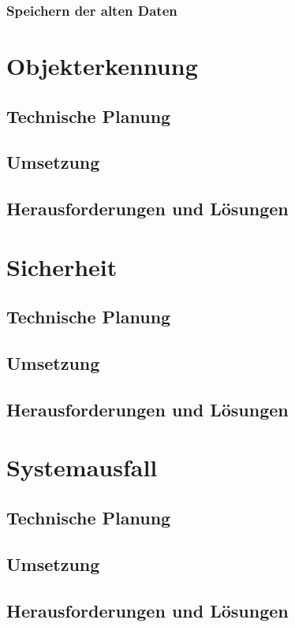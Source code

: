    \subsubsection{Speichern der alten Daten}


\section{Objekterkennung}

  \subsection{Technische Planung}

  \subsection{Umsetzung}

  \subsection{Herausforderungen und Lösungen}

\section{Sicherheit}

  \subsection{Technische Planung}

  \subsection{Umsetzung}

  \subsection{Herausforderungen und Lösungen}

\section{Systemausfall}

  \subsection{Technische Planung}

  \subsection{Umsetzung}

  \subsection{Herausforderungen und Lösungen}
